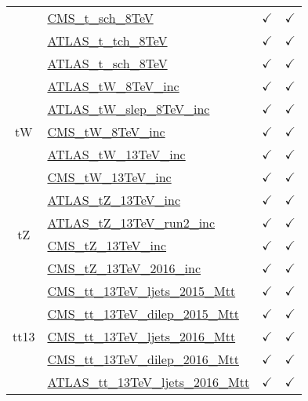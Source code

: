 \documentclass{article}
\begin{document}
\begin{table}[H]
\begin{tabular}{|c|l|c|c|}
 & \href{https://arxiv.org/abs/1603.02555}{CMS_t_sch_8TeV}  & $\checkmark$ & $\checkmark$\\ \cline{2-4}
 & \href{https://arxiv.org/abs/1702.02859}{ATLAS_t_tch_8TeV}  & $\checkmark$ & $\checkmark$\\ \cline{2-4}
 & \href{https://arxiv.org/abs/1511.05980}{ATLAS_t_sch_8TeV}  & $\checkmark$ & $\checkmark$
\\ \hline
\multirow{5}{*}{tW}
 & \href{https://arxiv.org/abs/1510.03752}{ATLAS_tW_8TeV_inc}  & $\checkmark$ & $\checkmark$\\ \cline{2-4}
 & \href{https://arxiv.org/abs/2007.01554}{ATLAS_tW_slep_8TeV_inc}  & $\checkmark$ & $\checkmark$\\ \cline{2-4}
 & \href{https://arxiv.org/abs/1401.2942}{CMS_tW_8TeV_inc}  & $\checkmark$ & $\checkmark$\\ \cline{2-4}
 & \href{https://arxiv.org/abs/1612.07231}{ATLAS_tW_13TeV_inc}  & $\checkmark$ & $\checkmark$\\ \cline{2-4}
 & \href{https://arxiv.org/abs/1805.07399}{CMS_tW_13TeV_inc}  & $\checkmark$ & $\checkmark$
\\ \hline
\multirow{4}{*}{tZ}
 & \href{https://arxiv.org/abs/1712.02825}{ATLAS_tZ_13TeV_inc}  & $\checkmark$ & $\checkmark$\\ \cline{2-4}
 & \href{https://arxiv.org/abs/2002.07546}{ATLAS_tZ_13TeV_run2_inc}  & $\checkmark$ & $\checkmark$\\ \cline{2-4}
 & \href{https://arxiv.org/abs/1712.02825}{CMS_tZ_13TeV_inc}  & $\checkmark$ & $\checkmark$\\ \cline{2-4}
 & \href{https://arxiv.org/abs/1812.05900}{CMS_tZ_13TeV_2016_inc}  & $\checkmark$ & $\checkmark$
\\ \hline
\multirow{5}{*}{tt13}
 & \href{https://arxiv.org/abs/1610.04191}{CMS_tt_13TeV_ljets_2015_Mtt}  & $\checkmark$ & $\checkmark$\\ \cline{2-4}
 & \href{https://arxiv.org/abs/1708.07638}{CMS_tt_13TeV_dilep_2015_Mtt}  & $\checkmark$ & $\checkmark$\\ \cline{2-4}
 & \href{https://arxiv.org/abs/1803.08856}{CMS_tt_13TeV_ljets_2016_Mtt}  & $\checkmark$ & $\checkmark$\\ \cline{2-4}
 & \href{https://arxiv.org/abs/1811.06625}{CMS_tt_13TeV_dilep_2016_Mtt}  & $\checkmark$ & $\checkmark$\\ \cline{2-4}
 & \href{https://arxiv.org/abs/1908.07305}{ATLAS_tt_13TeV_ljets_2016_Mtt}  & $\checkmark$ & $\checkmark$
\\ \hline

\end{tabular}
\end{table}
\end{document}
